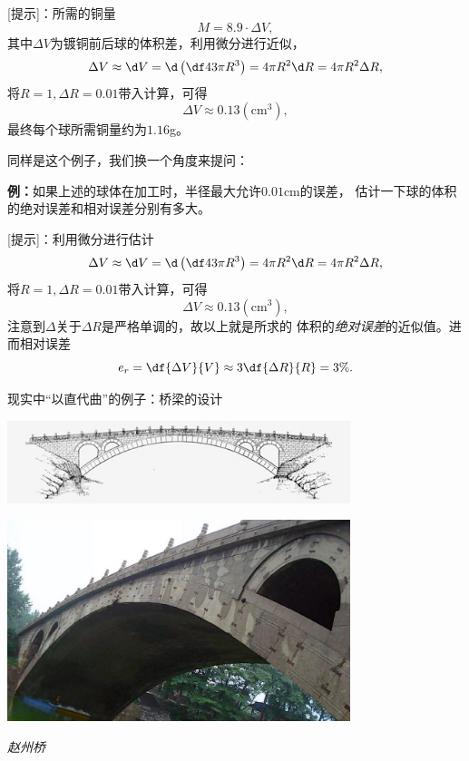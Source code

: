 [提示]：所需的铜量
$$M=8.9\cdot\Delta V,$$
其中$\Delta V$为镀铜前后球的体积差，利用微分进行近似，
$$\Delta V\approx \d V=\d\left(\df43\pi R^3\right)
=4\pi R^2\d R=4\pi R^2\Delta R,$$
将$R=1,\Delta R=0.01$带入计算，可得
$$\Delta V\approx 0.13(\mbox{cm}^3),$$
最终每个球所需铜量约为$1.16$g。

同样是这个例子，我们换一个角度来提问：

{\bf 例：}如果上述的球体在加工时，半径最大允许$0.01$cm的误差，
估计一下球的体积的绝对误差和相对误差分别有多大。

[提示]：利用微分进行估计
$$\Delta V\approx \d V=\d\left(\df43\pi R^3\right)
=4\pi R^2\d R=4\pi R^2\Delta R,$$
将$R=1,\Delta R=0.01$带入计算，可得
$$\Delta V\approx 0.13(\mbox{cm}^3),$$
注意到$\Delta$关于$\Delta R$是严格单调的，故以上就是所求的
体积的{\it 绝对误差}的近似值。进而相对误差
$$e_r=\df{\Delta V}{V}\approx 3\df{\Delta R}{R}=3\%.$$

现实中“以直代曲”的例子：桥梁的设计

\begin{center}
	\includegraphics[width=0.75\textwidth]{./images/ch2/archBridge-1.jpg}
	
	\includegraphics[width=0.75\textwidth]{./images/ch2/zhaozhouqiao.jpg}
	
	\it 赵州桥
\end{center}

